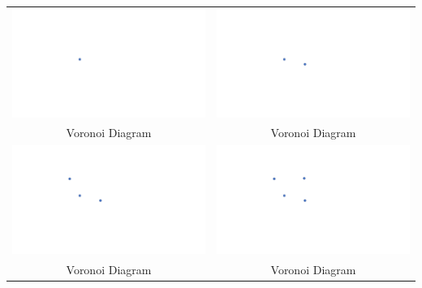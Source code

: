 \documentclass[a4paper,12pt]{article}
\begin{document}
\begin{tabular}{|c|c|}
\hline
\hspace{10pt}\includegraphics[width=0.425\linewidth]{../images/voronoi1.pdf}\hspace{10pt} & \hspace{10pt}\includegraphics[width=0.425\linewidth]{../images/voronoi2.pdf}\hspace{10pt} \\
Voronoi Diagram & Voronoi Diagram \\
\hline
\hspace{10pt}\includegraphics[width=0.425\linewidth]{../images/voronoi3.pdf}\hspace{10pt} & \hspace{10pt}\includegraphics[width=0.425\linewidth]{../images/voronoi4.pdf}\hspace{10pt} \\
Voronoi Diagram & Voronoi Diagram \\
\hline
\end{tabular}
\end{document}
